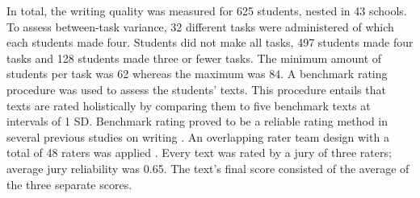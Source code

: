 \documentclass[man, mask]{apa7}
\begin{document}
In total, the writing quality was measured for 625 students, nested in 43 schools. To assess between-task variance, 32 different tasks were administered of which each students made four. Students did not make all tasks, 497 students made four tasks and 128 students made three or fewer tasks. The minimum amount of students per task was 62 whereas the maximum was 84. 
A benchmark rating procedure was used to assess the students' texts.
This procedure entails that texts are rated holistically by comparing them to five benchmark texts at intervals of 1 SD.
Benchmark rating proved to be a reliable rating method in several previous studies on writing \parencite{blok1986essay, de2016student, rietdijk2017improving,bouwer2017tekster}.
An overlapping rater team design with a total of 48 raters was applied \parencite{vandenbergh1989method}.
Every text was rated by a jury of three raters; average jury reliability was 0.65. The text's final score consisted of the average of the three separate scores.
\end{document}
